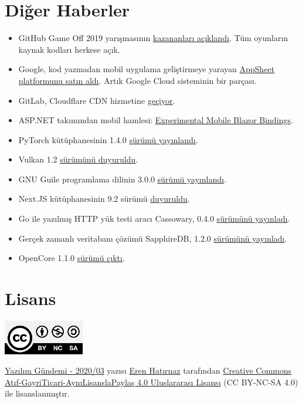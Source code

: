 \documentclass[11pt]{article}
\begin{document}
\section{Diğer Haberler}
\label{sec:org60d6dc7}
\begin{itemize}
\item GitHub Game Off 2019 yarışmasının \href{https://github.blog/2020-01-14-game-off-2019-winners/}{kazananları açıklandı}. Tüm oyunların kaynak
kodları herkese açık.
\item Google, kod yazmadan mobil uygulama geliştirmeye yarayan \href{https://www.appsheet.com/}{AppSheet} \href{https://techcrunch.com/2020/01/14/google-acquires-appsheet-to-bring-no-code-development-to-google-cloud/}{platformunu
satın aldı}. Artık Google Cloud sisteminin bir parçası.
\item GitLab, Cloudflare CDN hizmetine \href{https://about.gitlab.com/blog/2020/01/16/gitlab-changes-to-cloudflare/}{geçiyor}.
\item ASP.NET takımından mobil hamlesi: \href{https://devblogs.microsoft.com/aspnet/mobile-blazor-bindings-experiment/}{Experimental Mobile Blazor Bindings}.
\item PyTorch kütüphanesinin 1.4.0 \href{https://github.com/pytorch/pytorch/releases/tag/v1.4.0}{sürümü yayınlandı}.
\item Vulkan 1.2 \href{https://www.khronos.org/news/press/khronos-group-releases-vulkan-1.2}{sürümünü duyuruldu}.
\item GNU Guile programlama dilinin 3.0.0 \href{https://www.gnu.org/software/guile/news/gnu-guile-300-released.html}{sürümü yayınlandı}.
\item Next.JS kütüphanesinin 9.2 sürümü \href{https://nextjs.org/blog/next-9-2}{duyuruldu}.
\item Go ile yazılmış HTTP yük testi aracı Cassowary, 0.4.0 \href{https://github.com/rogerwelin/cassowary/releases/tag/v0.4.0}{sürümünü yayınladı}.
\item Gerçek zamanlı veritabanı çözümü SapphireDB, 1.2.0 \href{https://github.com/SapphireDb/SapphireDb/releases/tag/1.2.0}{sürümünü yayınladı}.
\item OpenCore 1.1.0 \href{https://github.com/opencorero/opencore/releases/tag/1.1.0}{sürümü çıktı}.
\end{itemize}
\section{Lisans}
\label{sec:org29a820e}
\begin{center}
\begin{center}
\includegraphics[height=1.5cm]{../../../img/CC_BY-NC-SA_4.0.png}
\end{center}

\href{yazilim-gundemi-2020-03.pdf}{Yazılım Gündemi - 2020/03} yazısı \href{https://erenhatirnaz.github.io}{Eren Hatırnaz} tarafından \href{http://creativecommons.org/licenses/by-nc-sa/4.0/}{Creative Commons
Atıf-GayriTicari-AynıLisanslaPaylaş 4.0 Uluslararası Lisansı} (CC BY-NC-SA 4.0)
ile lisanslanmıştır.
\end{center}
\end{document}
